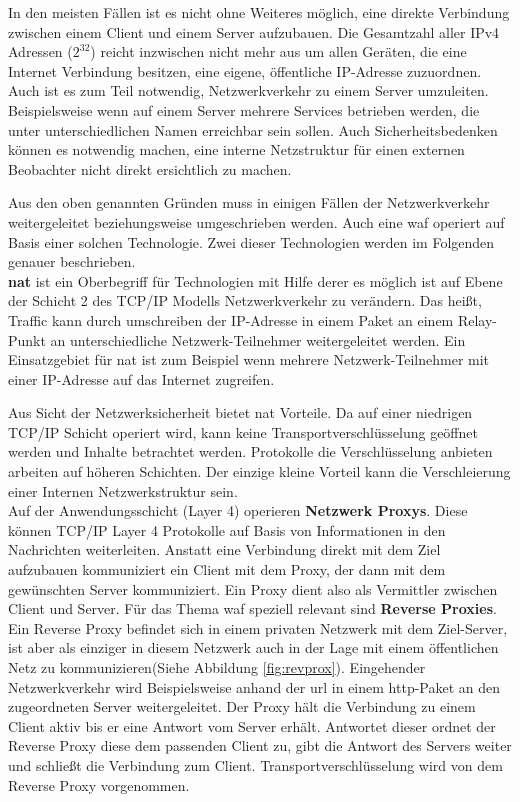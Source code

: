 In den meisten Fällen ist es nicht ohne Weiteres möglich, eine direkte Verbindung zwischen einem Client und einem Server aufzubauen.
Die Gesamtzahl aller IPv4 Adressen ($2^{32}$) reicht inzwischen nicht mehr aus um allen Geräten, die eine Internet Verbindung besitzen, eine eigene, öffentliche IP-Adresse zuzuordnen.
Auch ist es zum Teil notwendig, Netzwerkverkehr zu einem Server umzuleiten.
Beispielsweise wenn auf einem Server mehrere Services betrieben werden, die unter unterschiedlichen Namen erreichbar sein sollen.
Auch Sicherheitsbedenken können es notwendig machen, eine interne Netzstruktur für einen externen Beobachter nicht direkt ersichtlich zu machen.

Aus den oben genannten Gründen muss in einigen Fällen der Netzwerkverkehr weitergeleitet beziehungsweise umgeschrieben werden.
Auch eine \ac{waf} operiert auf Basis einer solchen Technologie.
Zwei dieser Technologien werden im Folgenden genauer beschrieben.\\

\textbf{\ac{nat}} ist ein Oberbegriff für Technologien mit Hilfe derer es möglich ist auf Ebene der Schicht 2 des TCP/IP Modells Netzwerkverkehr zu verändern.
Das heißt, Traffic kann durch umschreiben der IP-Adresse in einem Paket an einem Relay-Punkt an unterschiedliche Netzwerk-Teilnehmer weitergeleitet werden.
Ein Einsatzgebiet für \ac{nat} ist zum Beispiel wenn mehrere Netzwerk-Teilnehmer mit einer IP-Adresse auf das Internet zugreifen.

Aus Sicht der Netzwerksicherheit bietet \ac{nat} Vorteile.
Da auf einer niedrigen TCP/IP Schicht operiert wird, kann keine Transportverschlüsselung geöffnet werden und Inhalte betrachtet werden.
Protokolle die Verschlüsselung anbieten arbeiten auf höheren Schichten.
Der einzige kleine Vorteil kann die Verschleierung einer Internen Netzwerkstruktur sein\cite{NATNetworkAddress}.\\

Auf der Anwendungsschicht (Layer 4) operieren \textbf{Netzwerk Proxys}.
Diese können TCP/IP Layer 4 Protokolle auf Basis von Informationen in den Nachrichten weiterleiten.
Anstatt eine Verbindung direkt mit dem Ziel aufzubauen kommuniziert ein Client mit dem Proxy, der dann mit dem gewünschten Server kommuniziert.
Ein Proxy dient also als Vermittler zwischen Client und Server.
Für das Thema \ac{waf} speziell relevant sind \textbf{Reverse Proxies}.
Ein Reverse Proxy befindet sich in einem privaten Netzwerk mit dem Ziel-Server, ist aber als einziger in diesem Netzwerk auch in der Lage mit einem öffentlichen Netz zu kommunizieren(Siehe Abbildung \ref{fig:revprox}).
Eingehender Netzwerkverkehr wird Beispielsweise anhand der \ac{url} in einem \ac{http}-Paket an den zugeordneten Server weitergeleitet.
Der Proxy hält die Verbindung zu einem Client aktiv bis er eine Antwort vom Server erhält.
Antwortet dieser ordnet der Reverse Proxy diese dem passenden Client zu, gibt die Antwort des Servers weiter und schließt die Verbindung zum Client.
Transportverschlüsselung wird von dem Reverse Proxy vorgenommen.

